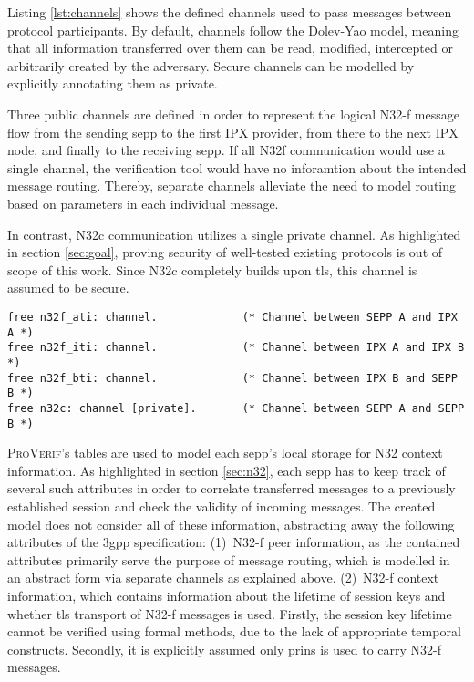 Listing \ref{lst:channels} shows the defined channels used to pass messages between protocol participants.
By default, channels follow the Dolev-Yao model, meaning that all information transferred over them can be read, modified, intercepted or arbitrarily created by the adversary.
Secure channels can be modelled by explicitly annotating them as private.

Three public channels are defined in order to represent the logical N32-f message flow from the sending \gls{sepp} to the first IPX provider, from there to the next IPX node, and finally to the receiving \gls{sepp}.
If all N32f communication would use a single channel, the verification tool would have no inforamtion about the intended message routing.
Thereby, separate channels alleviate the need to model routing based on parameters in each individual message.

In contrast, N32c communication utilizes a single private channel.
As highlighted in section \ref{sec:goal}, proving security of well-tested existing protocols is out of scope of this work.
Since N32c completely builds upon \gls{tls}, this channel is assumed to be secure.

\begin{lstlisting}[caption={Custom type declarations},label={lst:channels},firstnumber=15]
free n32f_ati: channel.             (* Channel between SEPP A and IPX A *)
free n32f_iti: channel.             (* Channel between IPX A and IPX B *)
free n32f_bti: channel.             (* Channel between IPX B and SEPP B *)
free n32c: channel [private].       (* Channel between SEPP A and SEPP B *)
\end{lstlisting}

\textsc{ProVerif}'s tables are used to model each \gls{sepp}'s local storage for N32 context information.
As highlighted in section \ref{sec:n32}, each \gls{sepp} has to keep track of several such attributes in order to correlate transferred messages to a previously established session and check the validity of incoming messages.
The created model does not consider all of these information, abstracting away the following attributes of the \gls{3gpp} specification:
(1)~N32-f peer information, as the contained attributes primarily serve the purpose of message routing, which is modelled in an abstract form via separate channels as explained above.
(2)~N32-f context information, which contains information about the lifetime of session keys and whether \gls{tls} transport of N32-f messages is used.
Firstly, the session key lifetime cannot be verified using formal methods, due to the lack of appropriate temporal constructs.
Secondly, it is explicitly assumed only \gls{prins} is used to carry N32-f messages.

